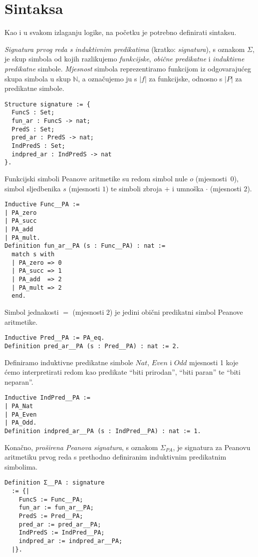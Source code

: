 \section{Sintaksa}\label{sec:sintaksa}
Kao i u svakom izlaganju logike, na početku je potrebno definirati sintaksu.
\begin{definition}\label{def:signatura}
  \textit{Signatura prvog reda s induktivnim predikatima} (kratko: \textit{signatura}), s oznakom \(\Sigma\),
  je skup simbola od kojih razlikujemo \textit{funkcijske}, \textit{obične predikatne}
  i \textit{induktivne predikatne} simbole.
  \textit{Mjesnost} simbola reprezentiramo funkcijom iz odgovarajućeg skupa simbola u skup \(\mathbb{N}\),
  a označujemo ju s \(|f|\) za funkcijske, odnosno s \(|P|\) za predikatne simbole.
  \begin{verbatim}
Structure signature := {
  FuncS : Set;
  fun_ar : FuncS -> nat;
  PredS : Set;
  pred_ar : PredS -> nat;
  IndPredS : Set;
  indpred_ar : IndPredS -> nat
}.
\end{verbatim}
\end{definition}
\begin{example}
  Funkcijski simboli Peanove aritmetike su redom simbol nule \(o\) (mjesnosti~\(0\)),
  simbol sljedbenika \(s\) (mjesnosti \(1\))
  te simboli zbroja \(+\) i umnoška \(\cdot\) (mjesnosti \(2\)).
\begin{verbatim}
Inductive Func__PA :=
| PA_zero
| PA_succ
| PA_add
| PA_mult.
Definition fun_ar__PA (s : Func__PA) : nat :=
  match s with
  | PA_zero => 0
  | PA_succ => 1
  | PA_add  => 2
  | PA_mult => 2
  end.
\end{verbatim}
  \noindent Simbol jednakosti \(=\) (mjesnosti \(2\)) je jedini obični predikatni simbol
  Peanove aritmetike.
\begin{verbatim}
Inductive Pred__PA := PA_eq.
Definition pred_ar__PA (s : Pred__PA) : nat := 2.
\end{verbatim}
  \noindent Definiramo induktivne predikatne simbole
  \(\mathit{Nat}\), \(\mathit{Even}\) i \(\mathit{Odd}\) mjesnosti 1 koje ćemo
  interpretirati redom kao predikate \enquote{biti prirodan}, \enquote{biti paran} te
  \enquote{biti neparan}.
\begin{verbatim}
Inductive IndPred__PA :=
| PA_Nat
| PA_Even
| PA_Odd.
Definition indpred_ar__PA (s : IndPred__PA) : nat := 1.
\end{verbatim}
  \noindent Konačno, \textit{proširena Peanova signatura}, s oznakom \(\Sigma_{\mathit{PA}}\), je signatura za
  Peanovu aritmetiku prvog reda s prethodno definiranim induktivnim predikatnim simbolima.
\begin{verbatim}
Definition Σ__PA : signature
  := {|
    FuncS := Func__PA;
    fun_ar := fun_ar__PA;
    PredS := Pred__PA;
    pred_ar := pred_ar__PA;
    IndPredS := IndPred__PA;
    indpred_ar := indpred_ar__PA;
  |}.
\end{verbatim}
\end{example}
